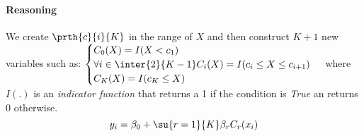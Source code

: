 \paragraph{Reasoning}
We create $\prth{c}{i}{K}$ in the range of $X$ and then construct
$K+1$ new variables such as:
$
\begin{cases}
	C_{0}(X)=I(X<c_{1})\\
	\forall i\in\inter{2}{K-1} C_{i}(X)=I(c_{i}\leq X\leq c_{i+1})\\
	C_{K}(X)=I(c_{K}\leq X)
\end{cases}
$
where $I(.)$ is an \emph{indicator function} that returns a 1 if the
condition is \emph{True} an returns 0 otherwise.
$$
y_{i}=\beta_{0}+\su{{r=1}}{K}\beta_{r}C_{r}(x_{i})
$$
